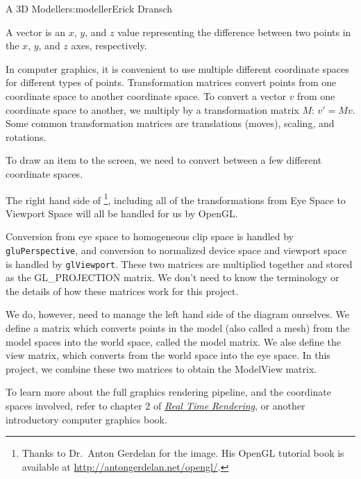 \begin{aosachapter}{A 3D Modeller}{s:modeller}{Erick Dransch}
\label{vector}

A vector is an $x$, $y$, and $z$ value representing the difference
between two points in the $x$, $y$, and $z$ axes, respectively.

\label{transformation-matrix}

In computer graphics, it is convenient to use multiple different
coordinate spaces for different types of points. Transformation matrices
convert points from one coordinate space to another coordinate space. To
convert a vector $v$ from one coordinate space to another, we multiply
by a transformation matrix $M$: $v' = M v$. Some common transformation
matrices are translations (moves), scaling, and rotations.

\label{model-world-view-and-projection-coordinate-spaces}


To draw an item to the screen, we need to convert between a few
different coordinate spaces.

The right hand side of \footnote{Thanks
  to Dr.~Anton Gerdelan for the image. His OpenGL tutorial book is
  available at \url{http://antongerdelan.net/opengl/}.}, including all
of the transformations from Eye Space to Viewport Space will all be
handled for us by OpenGL.

Conversion from eye space to homogeneous clip space is handled by
\texttt{gluPerspective}, and conversion to normalized device space and
viewport space is handled by \texttt{glViewport}. These two matrices are
multiplied together and stored as the GL\_PROJECTION matrix. We don't
need to know the terminology or the details of how these matrices work
for this project.

We do, however, need to manage the left hand side of the diagram
ourselves. We define a matrix which converts points in the model (also
called a mesh) from the model spaces into the world space, called the
model matrix. We alse define the view matrix, which converts from the
world space into the eye space. In this project, we combine these two
matrices to obtain the ModelView matrix.

To learn more about the full graphics rendering pipeline, and the
coordinate spaces involved, refer to chapter 2 of
\href{http://www.realtimerendering.com/}{\emph{Real Time Rendering}}, or
another introductory computer graphics book.


\end{aosachapter}
